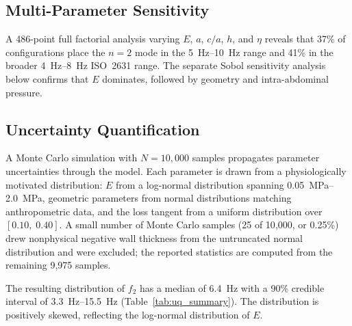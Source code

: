 \subsection{Multi-Parameter Sensitivity}

A 486-point full factorial analysis varying $E$, $a$, $c/a$, $h$, and $\eta$
reveals that 37\% of configurations place the $n=2$ mode in the
\SIrange{5}{10}{\hertz} range and 41\% in the broader \SIrange{4}{8}{\hertz}
ISO~2631 range.  The separate Sobol sensitivity analysis below confirms that
$E$ dominates, followed by geometry and intra-abdominal pressure.

\subsection{Uncertainty Quantification}

A Monte Carlo simulation with $N = 10{,}000$ samples propagates parameter
uncertainties through the model.  Each parameter is drawn from a
physiologically motivated distribution: $E$ from a log-normal distribution
spanning \SIrange{0.05}{2.0}{\mega\pascal}, geometric parameters from normal
distributions matching anthropometric data, and the loss tangent from a
uniform distribution over $[0.10,\; 0.40]$.
A small number of Monte Carlo samples (25 of 10{,}000, or 0.25\%) drew
nonphysical negative wall thickness from the untruncated normal distribution
and were excluded; the reported statistics are computed from the remaining
9{,}975 samples.

The resulting distribution of $f_2$ has a median of \SI{6.4}{\hertz} with a
90\% credible interval of \SIrange{3.3}{15.5}{\hertz}
(Table~\ref{tab:uq_summary}).  The distribution is positively skewed,
reflecting the log-normal distribution of $E$.

